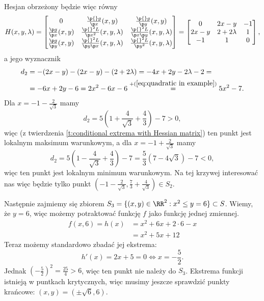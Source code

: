 \begin{solution}
    Hesjan obrzeżony będzie więc równy
    \[ H(x, y, \lambda) = \begin{bmatrix}
        0 & \frac{\p{} g}{\p x}(x, y) & \frac{\p{} g}{\p y}(x, y) \\
        \frac{\p g}{\p x}(x, y) & \frac{\p{}^2 L}{\p x^2}(x, y, \lambda) & \frac{\p{}^2 L}{\p x \p y}(x, y, \lambda) \\
        \frac{\p g}{\p y}(x, y) & \frac{\p{}^2 L}{\p y \p x}(x, y, \lambda) & \frac{\p{}^2 L}{\p y^2}(x, y, \lambda)
    \end{bmatrix} = \begin{bmatrix}
        0 & 2x - y & -1 \\
        2x - y & 2 + 2\lambda & 1 \\
        -1 & 1 & 0
    \end{bmatrix}, \]
    a jego wyznacznik
    \begin{align*}
        d_2 &= -(2x -y) - (2x - y) - (2 + 2\lambda) = -4x + 2y - 2\lambda - 2 = \\
        &= -6x + 2y - 6 = 2x^2 - 6x - 6 \stackrel{+(\ref{eq:quadratic in example})}{=} 5x^2 - 7.
    \end{align*}
    Dla $x = -1 - \frac{2}{\sqrt{3}}$ mamy
    \[ d_2 = 5\left(1 + \frac{4}{\sqrt{3}} + \frac{4}{3}\right) - 7 > 0, \]
    więc (z twierdzenia \ref{t:conditional extrema with Hessian matrix}) ten punkt jest lokalnym maksimum warunkowym, a dla $x = -1 + \frac{2}{\sqrt{3}}$ mamy
    \[ d_2 = 5\left(1 - \frac{4}{\sqrt{3}} + \frac{4}{3}\right) - 7 = \frac{5}{3}\left(7-4\sqrt{3}\right) - 7 < 0, \]
    więc ten punkt jest lokalnym minimum warunkowym. Na tej krzywej interesować nas więc będzie tylko punkt $\left(-1-\frac{2}{\sqrt{3}}, \frac{7}{3} + \frac{4}{\sqrt{3}}\right) \in S_2$.

    Następnie zajmiemy się zbiorem $S_3 = \{(x, y) \in \RR^2 : x^2 \leq y = 6\} \subset S$. Wiemy, że $y = 6$, więc możemy potraktować funkcję $f$ jako funkcję jednej zmiennej.
    \begin{align*} f(x, 6) = h(x) &= x^2 + 6x + 2\cdot 6 - x \\
                                  &= x^2 + 5x + 12 \end{align*}
    Teraz możemy standardowo zbadać jej ekstrema:
    \[ h'(x) = 2x + 5 = 0 \iff x = -\frac{5}{2}. \]
    Jednak $\left(-\frac{5}{2}\right)^2 = \frac{25}{4} > 6$, więc ten punkt nie należy do $S_3$. Ekstrema funkcji istnieją w puntkach krytycznych, więc musimy jeszcze sprawdzić punkty krańcowe: $(x, y) = (\pm\sqrt{6}, 6)$.


\end{solution}

